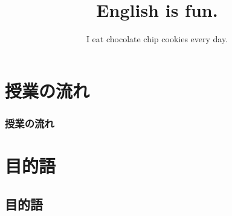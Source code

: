 \documentclass[aspectratio=169,xcolor={dvipsnames,table}]{beamer}
\title{English is fun.}
\subtitle{I eat chocolate chip cookies every day.}
\author{}
\institute[]{}
\date[]
\begin{document}
\begin{frame}[plain]
  \titlepage
\end{frame}

\section*{授業の流れ}
\begin{frame}[plain]
  \frametitle{授業の流れ}
  \tableofcontents
\end{frame}

\section{目的語}
\subsection{目的語}
\end{document}

